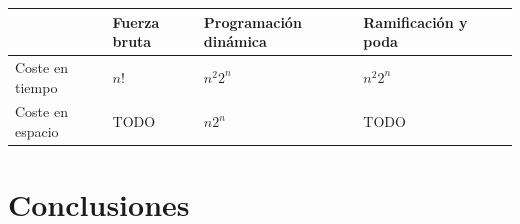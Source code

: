 \documentclass{article}
\begin{document}
\begin{center}
    \begin{tabular}{||m{2.5cm} | m{2cm} | m{2cm} | m{2cm} | m{2cm}||}
        \hline
                            & Fuerza bruta   & Programación dinámica    & Ramificación y poda   \\ [0.5ex]
        \hline\hline
        Coste en tiempo     & $n!$           & $n^2 2^n$                & $n^2 2^n$              \\
        \hline
        Coste en espacio    & TODO           & $n2^n$                   & TODO                  \\ [1ex]
        \hline
   \end{tabular}
\end{center}



\section{Conclusiones}

\end{document}
